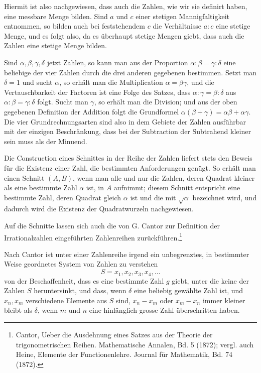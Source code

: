 \documentclass[11pt]{article}
\begin{document}
Hiermit ist also nachgewiesen, dass auch die Zahlen, wie wir sie definirt haben, eine messbare Menge bilden. Sind $a$ und $c$ einer stetigen Mannigfaltigkeit entnommen, so bilden auch bei feststehendem $c$ die Verhältnisse $a:c$ eine stetige Menge, und es folgt also, da es überhaupt stetige Mengen giebt, dass auch die Zahlen eine stetige Menge bilden.

Sind $\alpha,\beta,\gamma,\delta$ jetzt Zahlen, so kann man aus der Proportion $\alpha:\beta=\gamma:\delta$ eine beliebige der vier Zahlen durch die drei anderen gegebenen bestimmen. Setzt man $\delta=1$ und sucht $\alpha$, so erhält man die Multiplication $\alpha=\beta\gamma$, und die Vertauschbarkeit der Factoren ist eine Folge des Satzes, dass $\alpha:\gamma=\beta:\delta$ aus $\alpha:\beta=\gamma:\delta$ folgt. Sucht man $\gamma$, so erhält man die Division; und aus der oben gegebenen Definition der Addition folgt die Grundformel $\alpha(\beta+
\gamma)=\alpha\beta+\alpha\gamma$. Die vier Grundrechnungsarten sind also in dem Gebiete der Zahlen ausführbar mit der einzigen Beschränkung, dass bei der Subtraction der Subtrahend kleiner sein muss als der Minuend.

Die Construction eines Schnittes in der Reihe der Zahlen liefert stets den Beweis für die Existenz einer Zahl, die bestimmten Anforderungen genügt. So erhält man einen Schnitt $(A,B)$, wenn man alle und nur die Zahlen, deren Quadrat kleiner als eine bestimmte Zahl $\alpha$ ist, in $A$ aufnimmt; diesem Schnitt entspricht eine bestimmte Zahl, deren Quadrat gleich $\alpha$ ist und die mit $\sqrt\alpha$ bezeichnet wird, und dadurch wird die Existenz der Quadratwurzeln nachgewiesen.

Auf die Schnitte lassen sich auch die von G. Cantor zur Definition der Irrationalzahlen eingeführten Zahlenreihen zurückführen.\footnote{Cantor, Ueber die Ausdehnung eines Satzes aus der Theorie der trigonometrischen Reihen. Mathematische Annalen, Bd. 5 (1872); vergl. auch Heine, Elemente der Functionenlehre. Journal für Mathematik, Bd. 74 (1872).}

Nach Cantor ist unter einer Zahlenreihe irgend ein unbegrenztes, in bestimmter Weise geordnetes System von Zahlen zu verstehen
\[
 S=x_1,x_2,x_3,x_4,\ldots
\]
von der Beschaffenheit, dass es eine bestimmte Zahl $g$ giebt, unter die keine der Zahlen $S$ heruntersinkt, und dass, wenn $\delta$ eine beliebig gewählte Zahl ist, und $x_n,x_m$ verschiedene Elemente aus $S$ sind, $x_n-x_m$ oder $x_m-x_n$ immer kleiner bleibt als $\delta$, wenn $m$ und $n$ eine hinlänglich grosse Zahl überschritten haben.
\end{document}
